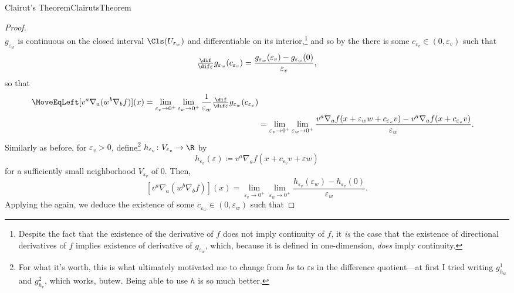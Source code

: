 \begin{thm}{Clairut's Theorem}{ClairutsTheorem}
\begin{proof}
\begin{equation*}
\end{equation*}
$g_{\varepsilon _w}$ is continuous on the closed interval $\Cls (U_{\varepsilon _w})$ and differentiable on its interior,\footnote{Despite the fact that the existence of the derivative of $f$ does not imply continuity of $f$, it \emph{is} the case that the existence of directional derivatives of $f$ implies existence of derivative of $g_{\varepsilon _w}$, which, because it is defined in one-dimension, \emph{does} imply continuity.} and so by the  there is some $c_{\varepsilon _v}\in (0,\varepsilon _v)$ such that
\begin{equation}
\tfrac{\dif}{\dif \varepsilon}g_{\varepsilon _w}(c_{\varepsilon _v})=\frac{g_{\varepsilon _w}(\varepsilon _v)-g_{\varepsilon _w}(0)}{\varepsilon _v},
\end{equation}
so that
{\scriptsize
\begin{equation*}
\begin{split}
\MoveEqLeft
[v^a\nabla _a(w^b\nabla _bf)](x)=\lim _{\varepsilon _v\to 0^+}\lim _{\varepsilon _w\to 0^+}\frac{1}{\varepsilon _w}\tfrac{\dif}{\dif \varepsilon}g_{\varepsilon _w}(c_{\varepsilon _v}) \\
& =\lim _{\varepsilon _v\to 0^+}\lim _{\varepsilon _w\to 0^+}\frac{v^a\nabla _af(x+\varepsilon _ww+c_{\varepsilon _v}v)-v^a\nabla _af(x+c_{\varepsilon _v}v)}{\varepsilon _w}.
\end{split}
\end{equation*}
}
Similarly as before, for $\varepsilon _v>0$, define\footnote{For what it's worth, this is what ultimately motivated me to change from $h$s to $\varepsilon$s in the difference quotient---at first I tried writing $g_{h_w}^1$ and $g_{h_v}^2$, which works, but\textellipsis ew.  Being able to use $h$ is so much better.} $h_{\varepsilon _v}\colon V_{\varepsilon _v}\rightarrow \R$ by
\begin{equation}
h_{\varepsilon _v}(\varepsilon )\coloneqq v^a\nabla _af(x+c_{\varepsilon _v}v+\varepsilon w)
\end{equation}
for a sufficiently small neighborhood $V_{\varepsilon _v}$ of $0$.  Then,
\begin{equation*}
\left[ v^a\nabla _a(w^b\nabla _bf)\right] (x)=\lim _{\varepsilon _v\to 0^+}\lim _{\varepsilon _w\to 0^+}\frac{h_{\varepsilon _v}(\varepsilon _w)-h_{\varepsilon _v}(0)}{\varepsilon _w}.
\end{equation*}
Applying the  again, we deduce the existence of some $c_{\varepsilon _w}\in (0,\varepsilon _w)$ such that 

\end{proof}
\end{thm}
